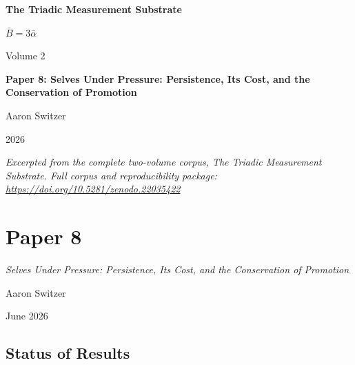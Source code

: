 \documentclass[11pt,oneside]{report}
\theoremstyle{definition}
\theoremstyle{remark}
\begin{document}
\thispagestyle{empty}
\begin{titlepage}
\centering
\vspace*{2cm}
{\sffamily\bfseries\Large The Triadic Measurement Substrate\par}
\vspace{0.6cm}
{\large $\bar{B} = 3\bar{\alpha}$\par}
\vspace{1cm}
{\sffamily\large Volume 2\par}
\vspace{1.4cm}
{\Large \bfseries Paper 8: Selves Under Pressure: Persistence, Its Cost, and the Conservation of Promotion\par}
\vfill
{\large Aaron Switzer\par}
\vspace{0.4cm}
{\large 2026\par}
\vspace{1.2cm}
{\small\itshape Excerpted from the complete two-volume corpus, \emph{The Triadic Measurement Substrate}. Full corpus and reproducibility package: \url{https://doi.org/10.5281/zenodo.22035422}\par}
\end{titlepage}
\cleardoublepage
{}

\chapter*{Paper 8}
\begingroup\centering
{\large\itshape Selves Under Pressure: Persistence, Its Cost, and the Conservation of Promotion\par}\vspace{0.8em}
{\normalsize Aaron Switzer\par}
{\small June 2026\par}
\endgroup\vspace{1.0em}

\par\vspace{0.6em}

\section*{Status of Results}
\end{document}
